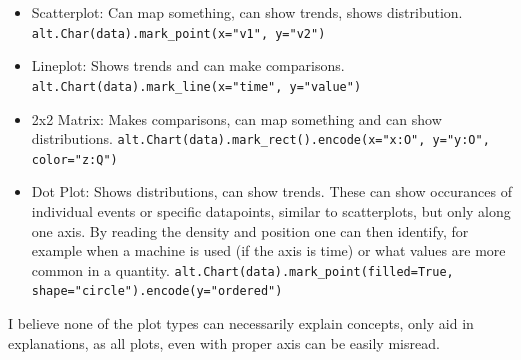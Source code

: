 \begin{exercise}
\begin{itemize}
            \item Scatterplot: Can map something, can show trends, shows distribution. \lstinline|alt.Char(data).mark_point(x="v1", y="v2")|
            \item Lineplot: Shows trends and can make comparisons. \lstinline|alt.Chart(data).mark_line(x="time", y="value")|
            \item 2x2 Matrix: Makes comparisons, can map something and can show distributions. \lstinline|alt.Chart(data).mark_rect().encode(x="x:O", y="y:O", color="z:Q")|
            \item Dot Plot: Shows distributions, can show trends. These can show occurances of individual events or specific datapoints, similar to scatterplots, but only along one axis. By reading the density and position one can then identify, for example when a machine is used (if the axis is time) or what values are more common in a quantity. \lstinline|alt.Chart(data).mark_point(filled=True, shape="circle").encode(y="ordered")|
        \end{itemize}

        I believe none of the plot types can necessarily explain concepts, only aid in explanations, as all plots, even with proper axis can be easily misread.
    \end{exercise}

